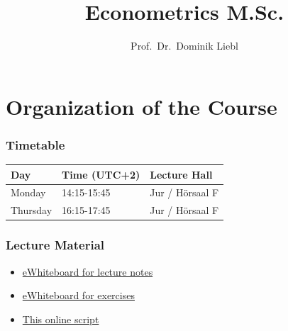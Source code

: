 \documentclass[
  letterpaper,
  DIV=11,
  numbers=noendperiod]{scrreprt}
\title{Econometrics M.Sc.}
\author{Prof.~Dr.~Dominik Liebl}
\date{}
\providecommand{\tightlist}{%
  \setlength{\itemsep}{0pt}\setlength{\parskip}{0pt}}\usepackage{longtable,booktabs,array}
\renewcommand*\contentsname{Table of contents}
\newcommand\contentsname{Table of contents}
\theoremstyle{definition}
\theoremstyle{plain}
\theoremstyle{plain}
\theoremstyle{remark}
\begin{document}
\maketitle
\ifdefined\Shaded\renewenvironment{Shaded}{\begin{tcolorbox}[enhanced, frame hidden, borderline west={3pt}{0pt}{shadecolor}, interior hidden, breakable, boxrule=0pt, sharp corners]}{\end{tcolorbox}}\fi

\renewcommand*\contentsname{Table of contents}
{
\hypersetup{linkcolor=}
\setcounter{tocdepth}{2}
\tableofcontents
}

\hypertarget{organization-of-the-course}{%
\chapter*{Organization of the Course}\label{organization-of-the-course}}

\hypertarget{timetable}{%
\subsection*{Timetable}\label{timetable}}

\begin{table}
\centering
\begin{tabular}[t]{l|l|l}
\hline
Day & Time (UTC+2) & Lecture Hall\\
\hline
Monday & 14:15-15:45 & Jur / Hörsaal F\\
\hline
Thursday & 16:15-17:45 & Jur / Hörsaal F\\
\hline
\end{tabular}
\end{table}

\hypertarget{lecture-material}{%
\subsection*{Lecture Material}\label{lecture-material}}

\begin{itemize}
\tightlist
\item
  \href{https://uni-bonn.sciebo.de/s/utwT9e0txGVDOpP}{eWhiteboard for
  lecture notes}
\item
  \href{https://uni-bonn.sciebo.de/s/Q0bER32lycuw6NV}{eWhiteboard for
  exercises}
\item
  \href{https://www.dliebl.com/Script-Econometrics-MSc/}{This online
  script}
\end{itemize}
\end{document}
